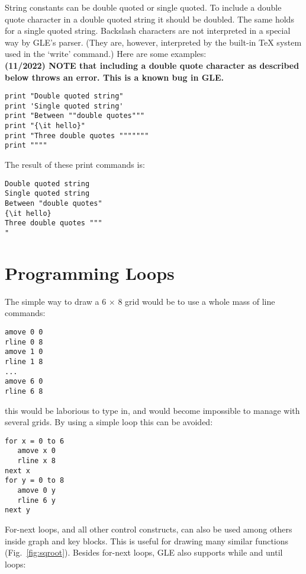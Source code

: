 String constants can be double quoted or single quoted. To include a double quote character in a double quoted string it should be doubled. The same holds for a single quoted string. Backslash characters are not interpreted in a special way by GLE's parser. (They are, however, interpreted by the built-in \TeX{} system used in the `{\sf write}' command.) Here are some examples:\\

\textbf{(11/2022) NOTE that including a double quote character as described below throws an error.  This is a known bug in GLE.}

\preglecode{}
\begin{Verbatim}
print "Double quoted string"
print 'Single quoted string'
print "Between ""double quotes"""
print "{\it hello}"
print "Three double quotes """""""
print """"
\end{Verbatim}
\postglecode{}

The result of these print commands is:

\preglecode{}
\begin{Verbatim}
Double quoted string
Single quoted string
Between "double quotes"
{\it hello}
Three double quotes """
"
\end{Verbatim}
\postglecode{}

\section{Programming Loops}

The simple way to draw a 6 $\times$ 8 grid would be to use a whole mass 
of line commands:

\preglecode{}
\begin{Verbatim}
amove 0 0 
rline 0 8 
amove 1 0 
rline 1 8 
...
amove 6 0 
rline 6 8
\end{Verbatim}
\postglecode{}

this would be laborious to type in, and would become 
impossible to manage with several grids.  By using a simple loop
this can be avoided:

\preglecode{}
\begin{Verbatim}
for x = 0 to 6
   amove x 0 
   rline x 8 
next x
for y = 0 to 8
   amove 0 y 
   rline 6 y 
next y 
\end{Verbatim}
\postglecode{}

For-next loops, and all other control constructs, can also be used among others inside graph and key blocks. This is useful for drawing many similar functions (Fig.~\ref{fig:sqroot}). Besides for-next loops, GLE also supports while and until loops:

